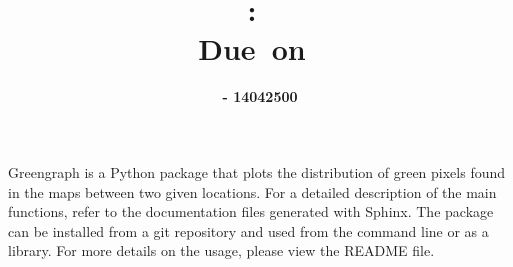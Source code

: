 \documentclass{article}
\title{
\vspace{2in}
\textmd{\textbf{\hmwkClass:\ \hmwkTitle}}\\
\normalsize\vspace{0.1in}\small{Due\ on\ \hmwkDueDate}\\
\vspace{3in}
}
\author{\textbf{\hmwkAuthorName  - 14042500}}
\date{} %
\begin{document}
\maketitle



\newpage

Greengraph is a Python package that plots the distribution of green pixels found in the maps between two given locations. For a detailed description of the main functions, refer to the documentation files generated with Sphinx. The package can be installed from a git repository and used from the command line or as a library. For more details on the usage, please view the README file. \\


\end{document}
